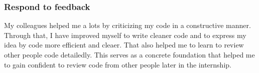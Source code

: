 \subsubsection{Respond to feedback}
My colleagues helped me a lots by criticizing my code in a constructive manner. Through that, I have improved myself to write cleaner code and to express my idea by code more efficient and cleaer.
That also helped me to learn to review other people code detailedly. This serves as a concrete foundation that helped me to gain confident to review code from other people later in the internship.


